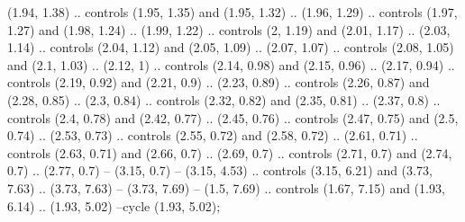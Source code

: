 \begin{ex}
{\begin{center}
{{\begin{scope}
						(1.94, 1.38) .. controls (1.95, 1.35) and (1.95, 1.32) ..
						(1.96, 1.29) .. controls (1.97, 1.27) and (1.98, 1.24) ..
						(1.99, 1.22) .. controls (2, 1.19) and (2.01, 1.17) ..
						(2.03, 1.14) .. controls (2.04, 1.12) and (2.05, 1.09) ..
						(2.07, 1.07) .. controls (2.08, 1.05) and (2.1, 1.03) ..
						(2.12, 1) .. controls (2.14, 0.98) and (2.15, 0.96) ..
						(2.17, 0.94) .. controls (2.19, 0.92) and (2.21, 0.9) ..
						(2.23, 0.89) .. controls (2.26, 0.87) and (2.28, 0.85) ..
						(2.3, 0.84) .. controls (2.32, 0.82) and (2.35, 0.81) ..
						(2.37, 0.8) .. controls (2.4, 0.78) and (2.42, 0.77) ..
						(2.45, 0.76) .. controls (2.47, 0.75) and (2.5, 0.74) ..
						(2.53, 0.73) .. controls (2.55, 0.72) and (2.58, 0.72) ..
						(2.61, 0.71) .. controls (2.63, 0.71) and (2.66, 0.7) ..
						(2.69, 0.7) .. controls (2.71, 0.7) and (2.74, 0.7) ..
						(2.77, 0.7) -- (3.15, 0.7) -- (3.15, 4.53) .. controls (3.15, 6.21) and (3.73, 7.63) ..
						(3.73, 7.63) -- (3.73, 7.69) -- (1.5, 7.69) .. controls (1.67, 7.15) and (1.93, 6.14) ..
						(1.93, 5.02) --cycle
						(1.93, 5.02);
						

\end{scope}}}
\end{center}}
\end{ex}
